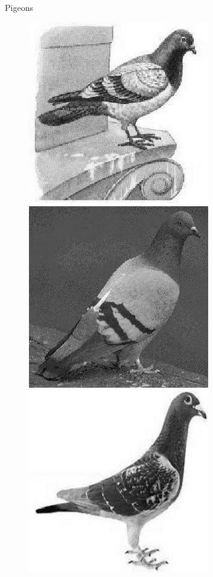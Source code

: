 \documentclass{beamer}
\begin{document}
\begin{frame}{Pigeons}
  \begin{figure}
    \centering
    \includegraphics[scale=.4]{pigeonrs-image_0001.jpg}
    \includegraphics[scale=.4]{pigeonrs-image_0002.jpg} \\
    \includegraphics[scale=.4]{pigeonrs-image_0003.jpg} 

\end{figure}
\end{frame}
\end{document}
